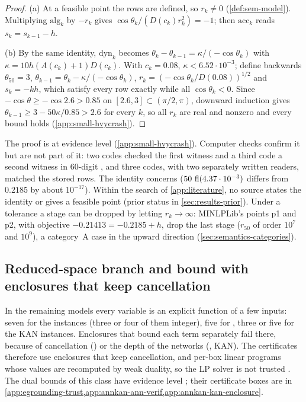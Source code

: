 \begin{proof}
(a) At a feasible point the rows are defined, so $r_k\ne0$ (\cref{def:sem-model}).
Multiplying $\text{alg}_k$ by $-r_k$ gives $\cos\theta_k/(D(c_k)r_k^2)=-1$; then $\text{acc}_k$ reads $s_k=s_{k-1}-h$.

(b) By the same identity, $\text{dyn}_k$ becomes $\theta_k-\theta_{k-1}=\kappa/(-\cos\theta_k)$ with $\kappa=10h(A(c_k)+1)D(c_k)$.
With $c_k=0.08$, $\kappa<6.52\cdot10^{-3}$; define backwards $\theta_{50}=3$, $\theta_{k-1}=\theta_k-\kappa/(-\cos\theta_k)$, $r_k=(-\cos\theta_k/D(0.08))^{1/2}$ and $s_k=-kh$, which satisfy every row exactly while all $\cos\theta_k<0$.
Since $-\cos\theta\ge-\cos2.6>0.85$ on $[2.6,3]\subset(\pi/2,\pi)$, downward induction gives $\theta_{k-1}\ge3-50\kappa/0.85>2.6$ for every $k$, so all $r_k$ are real and nonzero and every bound holds (\cref{app:small-hvycrash}).
\end{proof}

The proof is at evidence level  (\cref{app:small-hvycrash}).
Computer checks confirm it but are not part of it: two codes checked the first witness and a third code a second witness in 60-digit , and three codes, with two separately written readers, matched the stored rows.
The identity concerns  ($50\,\operatorname{fl}(4.37\cdot10^{-3})$ differs from $0.2185$ by about $10^{-17}$).
Within the search of \cref{app:literature}, no source states the identity or gives a feasible point (prior status in \cref{sec:results-prior}).
Under a tolerance a stage can be dropped by letting $r_k\to\infty$: MINLPLib's points p1 and p2, with objective $-0.21413=-0.2185+h$, drop the last stage ($r_{50}$ of order $10^{7}$ and $10^{9}$), a category~A case in the upward direction (\cref{sec:semantics-categories}).

\subsection{Reduced-space branch and bound with enclosures that keep cancellation}\label{sec:other-bb}

In the remaining models every variable is an explicit function of a few inputs: seven for the  instances (three or four of them integer), five for , three or five for the KAN instances.
Enclosures that bound each term separately fail there, because of cancellation () or the depth of the networks (, KAN).
The certificates therefore use enclosures that keep cancellation, and per-box linear programs whose values are recomputed by weak duality, so the LP solver is not trusted \citep{neumaier2004-safe-bounds-in-linear-and,ninin2015-a-reliable-affine-relaxation-method}.
The dual bounds of this class have evidence level ; their certificate boxes are in \cref{app:egrounding-trust,app:annkan-ann-verif,app:annkan-kan-enclosure}.

